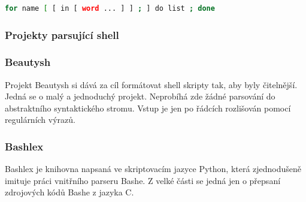 \documentclass[thesis=M,czech]{FITthesis}[2012/06/26]
\begin{document}
\begin{minipage}{\linewidth}
\begin{lstlisting}[language=bash, caption={Formát jedné varianty cyklu for v Bashi}, label={lst:bashfor}]
for name [ [ in [ word ... ] ] ; ] do list ; done
\end{lstlisting}
\end{minipage}




\subsubsection{Projekty parsující shell}

%
\subsubsection{Beautysh}

Projekt Beautysh si dává za cíl formátovat shell skripty tak, aby byly čitelnější. Jedná se o malý a jednoduchý projekt. Neprobíhá zde žádné parsování do abstraktního syntaktického stromu. Vstup je jen po řádcích rozlišován pomocí regulárních výrazů.






%
%
%
\subsubsection{Bashlex}\label{sec:bashlex}

Bashlex je knihovna napsaná ve skriptovacím jazyce Python, která zjednodušeně imituje práci vnitřního parseru Bashe. Z velké části se jedná jen o přepsaní zdrojových kódů Bashe z jazyka C.
\end{document}
